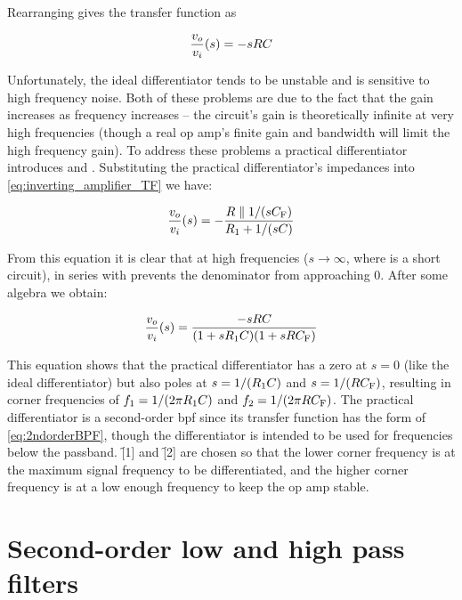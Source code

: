 Rearranging gives the transfer function as

\begin{equation}
	\frac{\vout}{\vin}(s) = -sRC
	\label{eq:ideal_differentiator_TF}
\end{equation}

Unfortunately, the ideal differentiator tends to be unstable and is sensitive to high frequency noise.
Both of these problems are due to the fact that the gain increases as frequency increases -- the circuit's gain is theoretically infinite at very high frequencies (though a real op amp's finite gain and bandwidth will limit the high frequency gain).
To address these problems a practical differentiator introduces \R[1] and \C[F].
Substituting the practical differentiator's impedances into \eqref{eq:inverting_amplifier_TF} we have:

\[\frac{\vout}{\vin}(s) = -\frac{R \parallel 1/(s\C[F])}{\R[1] + 1/(s\C)}\]

From this equation it is clear that at high frequencies (\(s \to \infty\), where \C is a short circuit), \R[1] in series with \C prevents the denominator from approaching 0.
After some algebra we obtain:

\begin{equation}
	\frac{\vout}{\vin}(s) = \frac{-sRC}{(1 + s\R[1] C)(1 + s R \C[F])}
	\label{eq:practical_differentiator_TF}
\end{equation}

This equation shows that the practical differentiator has a zero at \(s = 0\) (like the ideal differentiator) but also poles at \(s = 1/(\R[1] C)\) and \(s = 1/(R \C[F])\), resulting in corner frequencies of \(\f[1] = 1/(2\pi\R[1] C)\) and \(\f[2] = 1/(2\pi R \C[F])\).
The practical differentiator is a second-order \ac{bpf} since its transfer function has the form of \eqref{eq:2ndorderBPF}, though the differentiator is intended to be used for frequencies below the passband.
\f[1] and \f[2] are chosen so that the lower corner frequency is at the maximum signal frequency to be differentiated, and the higher corner frequency is at a low enough frequency to keep the op amp stable.

\section{Second-order low and high pass filters}
